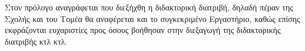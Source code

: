 
\begin{prologue}

Στον πρόλογο αναγράφεται που διεξήχθη η διδακτορική διατριβή, δηλαδή πέραν της Σχολής και του Τομέα θα αναφέρεται και το συγκεκριμένο Εργαστήριο, καθώς επίσης εκφράζονται ευχαριστίες προς όσους βοήθησαν στην διεξαγωγή της διδακτορικής διατριβής κτλ κτλ.

\end{prologue}
